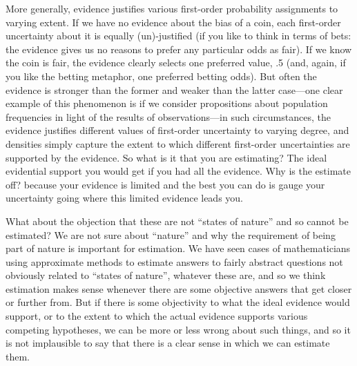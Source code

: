 \documentclass[
  10pt,
  dvipsnames,enabledeprecatedfontcommands]{scrartcl}
\begin{document}
More generally, evidence justifies various first-order probability
assignments to varying extent. If we have no evidence about the bias of
a coin, each first-order uncertainty about it is equally (un)-justified
(if you like to think in terms of bets: the evidence gives us no reasons
to prefer any particular odds as fair). If we know the coin is fair, the
evidence clearly selects one preferred value, .5 (and, again, if you
like the betting metaphor, one preferred betting odds). But often the
evidence is stronger than the former and weaker than the latter
case---one clear example of this phenomenon is if we consider
propositions about population frequencies in light of the results of
observations---in such circumstances, the evidence justifies different
values of first-order uncertainty to varying degree, and densities
simply capture the extent to which different first-order uncertainties
are supported by the evidence. So what is it that you are estimating?
The ideal evidential support you would get if you had all the evidence.
Why is the estimate off? because your evidence is limited and the best
you can do is gauge your uncertainty going where this limited evidence
leads you.

What about the objection that these are not ``states of nature'' and so
cannot be estimated? We are not sure about ``nature'' and why the
requirement of being part of nature is important for estimation. We have
seen cases of mathematicians using approximate methods to estimate
answers to fairly abstract questions not obviously related to ``states
of nature'', whatever these are, and so we think estimation makes sense
whenever there are some objective answers that get closer or further
from. But if there is some objectivity to what the ideal evidence would
support, or to the extent to which the actual evidence supports various
competing hypotheses, we can be more or less wrong about such things,
and so it is not implausible to say that there is a clear sense in which
we can estimate them.
\end{document}
